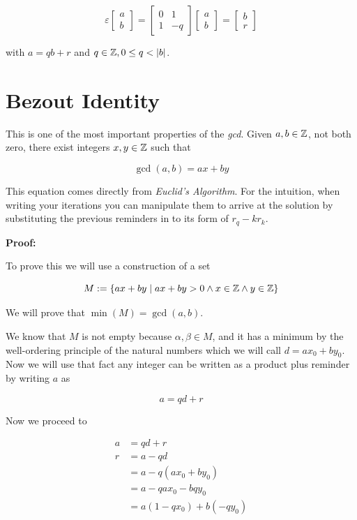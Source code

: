 \[
	\varepsilon
	\begin{bmatrix}
		a \\
		b
	\end{bmatrix}
	=
	\begin{bmatrix}
		0 & 1  \\
		1 & -q
	\end{bmatrix}
	\begin{bmatrix}
		a \\
		b
	\end{bmatrix}
	=
	\begin{bmatrix}
		b \\
		r
	\end{bmatrix}
\]

with \(a = qb + r\) and \(q \in \mathbb{Z}, 0 \le q < |b|\).

\section{Bezout Identity}

This is one of the most important properties of the \emph{gcd}.
Given \(a, b \in \mathbb{Z}\), not both zero, there exist integers \(x, y \in \mathbb{Z}\) such that

\[
	\gcd(a, b) = ax + by
\]

This equation comes directly from \emph{Euclid's Algorithm}. For the intuition, when writing your iterations
you can manipulate them to arrive at the solution by substituting the previous reminders in to its form of \(r_{q} - kr_{k}\).

\textbf{Proof:}

To prove this we will use a construction of a set

\[
	M := \{ax + by \mid ax + b y > 0 \land x \in \mathbb{Z} \land y \in \mathbb{Z}\}
\]

We will prove that \(\min(M) = \gcd(a, b)\).


We know that \(M\) is not empty because \(\alpha, \beta \in M\), and it has a minimum by the well-ordering principle
of the natural numbers which we will call \(d = a x_0 + b y_0\). Now we will use that fact any integer can be written as a product plus
reminder by writing \(a\) as

\[
	a = qd + r
\]

Now we proceed to

\begin{align*}
	a & = qd + r                  \\
	r & = a - qd                  \\
	  & = a - q( a x_0 + b y_0)   \\
	  & = a - qax_0 - bqy_0       \\
	  & = a(1 - qx_0) + b (-qy_0)
\end{align*}

